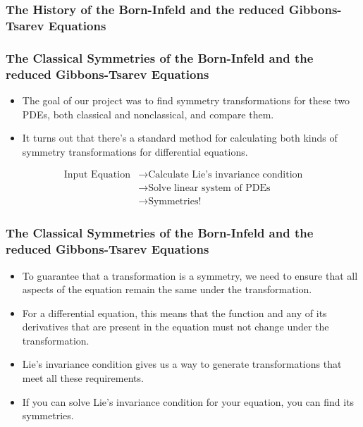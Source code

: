\documentclass{beamer}
\begin{document}
\begin{frame}
    \frametitle{The History of the Born-Infeld and the reduced Gibbons-Tsarev Equations}

\end{frame}


\begin{frame}
    \frametitle{The Classical Symmetries of the Born-Infeld and the reduced Gibbons-Tsarev Equations}
    \begin{itemize}
        \item The goal of our project was to find symmetry transformations for these two PDEs, both classical and nonclassical, and compare them.
        \item It turns out that there's a standard method for calculating both kinds of symmetry transformations for differential equations.
    \end{itemize}
    \vspace*{0.125in}
    \begin{large}
        \begin{align*}
            \text{Input Equation} &\rightarrow \text{Calculate Lie's invariance condition} \\
                           &\rightarrow \text{Solve linear system of PDEs} \\
                           &\rightarrow \text{Symmetries!}
        \end{align*}
    \end{large}

\end{frame}


\begin{frame}
    \frametitle{The Classical Symmetries of the Born-Infeld and the reduced Gibbons-Tsarev Equations}
    \begin{itemize}
        \item To guarantee that a transformation is a symmetry, we need to ensure that all aspects of the equation remain the same under the transformation. \pause
        \item For a differential equation, this means that the function and any of its derivatives that are present in the equation must not change under the transformation. \pause
        \item Lie's invariance condition gives us a way to generate transformations that meet all these requirements. \pause
        \item If you can solve Lie's invariance condition for your equation, you can find its symmetries.
    \end{itemize}
\end{frame}
\end{document}
